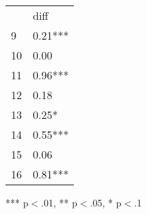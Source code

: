 \documentclass{article}
\begin{document}
\begin{table}[!h]
\centering
\begin{tabular}{ll}
\cline{1-2}
\multicolumn{1}{|l}{} &
  \multicolumn{1}{|l|}{diff} \\
\cline{1-2}
\multicolumn{1}{|l}{9} &
  \multicolumn{1}{|l|}{0.21***} \\
\cline{1-2}
\multicolumn{1}{|l}{10} &
  \multicolumn{1}{|l|}{0.00} \\
\cline{1-2}
\multicolumn{1}{|l}{11} &
  \multicolumn{1}{|l|}{0.96***} \\
\cline{1-2}
\multicolumn{1}{|l}{12} &
  \multicolumn{1}{|l|}{0.18} \\
\cline{1-2}
\multicolumn{1}{|l}{13} &
  \multicolumn{1}{|l|}{0.25*} \\
\cline{1-2}
\multicolumn{1}{|l}{14} &
  \multicolumn{1}{|l|}{0.55***} \\
\cline{1-2}
\multicolumn{1}{|l}{15} &
  \multicolumn{1}{|l|}{0.06} \\
\cline{1-2}
\multicolumn{1}{|l}{16} &
  \multicolumn{1}{|l|}{0.81***} \\
\cline{1-2}
\end{tabular}

\footnotesize{
*** p$<$.01, ** p$<$.05, * p$<$.1
}
\end{table}
\end{document}
